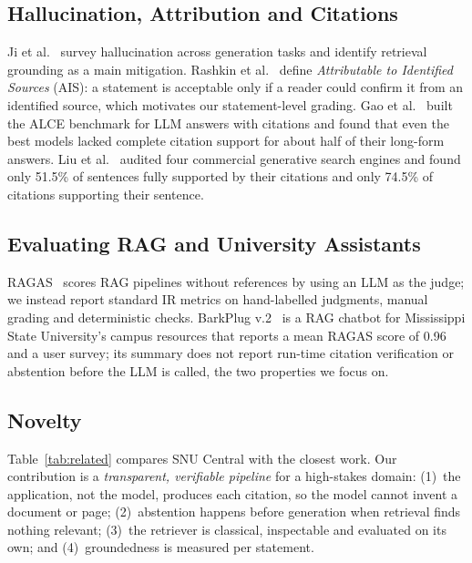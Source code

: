 \documentclass[conference]{IEEEtran}
\begin{document}
\subsection{Hallucination, Attribution and Citations}
Ji et al.~\cite{ji2023hallucination} survey hallucination across generation tasks and identify retrieval grounding as a main mitigation. Rashkin et al.~\cite{rashkin2023ais} define \emph{Attributable to Identified Sources} (AIS): a statement is acceptable only if a reader could confirm it from an identified source, which motivates our statement-level grading. Gao et al.~\cite{gao2023alce} built the ALCE benchmark for LLM answers with citations and found that even the best models lacked complete citation support for about half of their long-form answers. Liu et al.~\cite{liu2023verifiability} audited four commercial generative search engines and found only 51.5\% of sentences fully supported by their citations and only 74.5\% of citations supporting their sentence.

\subsection{Evaluating RAG and University Assistants}
RAGAS~\cite{es2024ragas} scores RAG pipelines without references by using an LLM as the judge; we instead report standard IR metrics on hand-labelled judgments, manual grading and deterministic checks. BarkPlug v.2~\cite{neupane2024barkplug} is a RAG chatbot for Mississippi State University's campus resources that reports a mean RAGAS score of 0.96 and a user survey; its summary does not report run-time citation verification or abstention before the LLM is called, the two properties we focus on.

\subsection{Novelty}
Table~\ref{tab:related} compares SNU Central with the closest work. Our contribution is a \emph{transparent, verifiable pipeline} for a high-stakes domain: (1)~the application, not the model, produces each citation, so the model cannot invent a document or page; (2)~abstention happens before generation when retrieval finds nothing relevant; (3)~the retriever is classical, inspectable and evaluated on its own; and (4)~groundedness is measured per statement.
\end{document}
